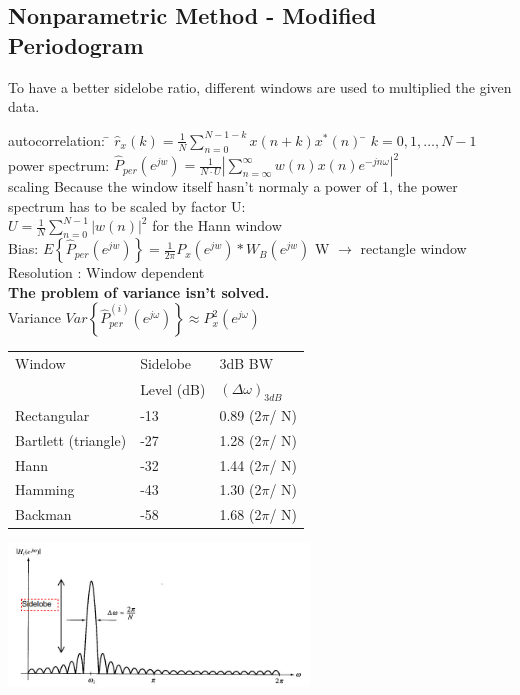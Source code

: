 \subsection{Nonparametric Method - Modified Periodogram }
To have a better sidelobe ratio, different windows are used to multiplied the given data.
\begin{tabbing}
autocorrelation: 	\= $\hat{r}_x(k) =\frac{1}{N} \sum \limits_{n=0}^{N-1-k} x(n+k)x^*(n)$   \hspace{4cm} \= $k=0,1,\ldots,N-1$ \\
power spectrum:  	\>  $\hat{P}_{per}(e^{jw}) = \frac{1}{N\cdot U}  \left\lvert \sum\limits_{n=\infty}^{\infty} w(n)x(n)e^{-jn\omega} \right\rvert ^2$   \\
scaling 			\> Because the window itself hasn't normaly a power of 1, the power spectrum has to be scaled by factor U:\\
\>					$U=\frac{1}{N} \sum\limits_{n=0}^{N-1}|w(n)|^2$ \> for the Hann window\\
Bias: 				\>  $E\left\lbrace \hat{P}_{per}(e^{jw}) \right\rbrace = \frac{1}{2 \pi}P_x(e^{jw})*W_B(e^{jw})$ \> W $\to$ rectangle window\\
Resolution : 		\>  Window dependent\\
\textbf{The problem of variance isn't solved.}\\
Variance 			\> $Var\left\lbrace \hat{P}_{per}^{(i)}(e^{j\omega}) \right\rbrace \approx P^2_x(e^{j\omega})$\\
\end{tabbing}

\begin{minipage}{10cm}
\begin{tabular}{p{3cm} p{3cm} p{3cm}}
Window	 &  	Sidelobe 	&3dB BW\\
&				Level (dB)	& $(\Delta\omega)_{3dB}$\\
\hline
Rectangular&			-13	&		0.89 (2$\pi$/ N)\\
Bartlett (triangle)&	-27	&		1.28 (2$\pi$/ N)\\
Hann				&	-32	&		1.44 (2$\pi$/ N)\\
Hamming&				-43	&		1.30 (2$\pi$/ N)\\
Backman		&			-58	&		1.68 (2$\pi$/ N)
\end{tabular}
\end{minipage}
\begin{minipage}{8cm}
\includegraphics[width=8cm]{./bilder/sidelobe.jpg}
\end{minipage}




